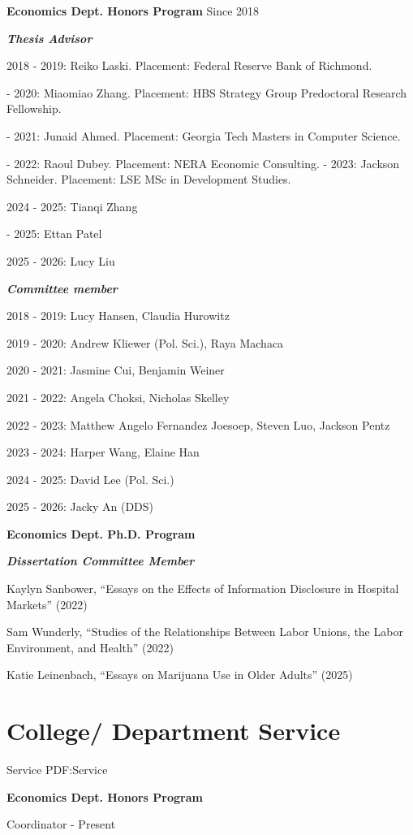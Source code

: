\documentclass[letterpaper,10pt,oneside]{article}
\begin{document}
\begin{body}
\par
\textbf{Economics Dept. Honors Program}
\hfill
Since 2018
\par
\textit{\textbf{Thesis Advisor}}
\par
2018 - 2019: Reiko Laski. Placement: Federal Reserve Bank of Richmond.
\par
{} - 2020: Miaomiao Zhang. Placement: HBS Strategy Group Predoctoral Research Fellowship.
\par
{} - 2021: Junaid Ahmed. Placement: Georgia Tech Masters in Computer Science.
\par
{} - 2022: Raoul Dubey. Placement: NERA Economic Consulting.
 - 2023: Jackson Schneider. Placement: LSE MSc in Development Studies.
\smallskip
\par
2024 - 2025: Tianqi Zhang
\par
{} - 2025: Ettan Patel
\smallskip
\par
2025 - 2026: Lucy Liu
\smallskip
\par
\textit{\textbf{Committee member}}
\par
2018 - 2019: Lucy Hansen, Claudia Hurowitz
\par
2019 - 2020: Andrew Kliewer (Pol. Sci.), Raya Machaca
\par
2020 - 2021: Jasmine Cui, Benjamin Weiner
\par
2021 - 2022: Angela Choksi, Nicholas Skelley
\par
2022 - 2023: Matthew Angelo Fernandez Joesoep, Steven Luo, Jackson Pentz 
\par
2023 - 2024: Harper Wang, Elaine Han
\par
2024 - 2025: David Lee (Pol. Sci.)
\par
2025 - 2026: Jacky An (DDS)
\bigskip

\par
\textbf{Economics Dept.  Ph.D. Program}
\par
\textit{\textbf{Dissertation Committee Member}}
\par
Kaylyn Sanbower, ``Essays on the Effects of Information Disclosure in Hospital Markets'' (2022)
\par
\smallskip
Sam Wunderly, ``Studies of the Relationships Between Labor Unions, the Labor Environment, and Health'' (2022)
\par
\smallskip
Katie Leinenbach, ``Essays on Marijuana Use in Older Adults'' (2025)

\section
{College/
Department Service}
{Service}
{PDF:Service}
\par
\textbf{Economics Dept. Honors Program}
\par
Coordinator
\hfill
{} - Present


\end{body}
\end{document}
